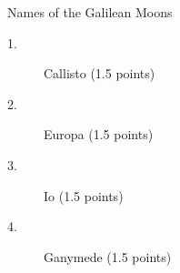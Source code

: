 Names of the Galilean Moons

\begin{description}
\item[1.] Callisto \hfill(1.5 points)
\item[2.] Europa \hfill(1.5 points)
\item[3.] Io \hfill(1.5 points)
\item[4.] Ganymede \hfill(1.5 points)
\end{description}
